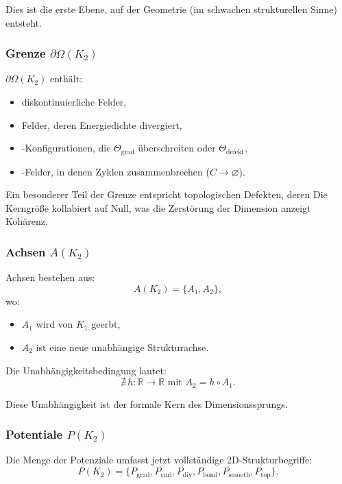 Dies ist die erste Ebene, auf der Geometrie (im schwachen strukturellen Sinne)
entsteht.

\subsubsection{Grenze \texorpdfstring{$\partial\Omega(K_2)$}{\partial\Omega(K_2)}}

$\partial\Omega(K_2)$ enthält:
\begin{itemize}
    \item diskontinuierliche Felder,
    \item Felder, deren Energiedichte divergiert,
    \item-Konfigurationen, die $\Theta_{\mathrm{grad}}$ überschreiten oder
          $\Theta_{\mathrm{defekt}}$,
    \item-Felder, in denen Zyklen zusammenbrechen ($C \to \varnothing$).
\end{itemize}

Ein besonderer Teil der Grenze entspricht topologischen Defekten, deren
Die Kerngröße kollabiert auf Null, was die Zerstörung der Dimension anzeigt
Kohärenz.

\subsubsection{Achsen \texorpdfstring{$A(K_2)$}{A(K_2)}}

Achsen bestehen aus:
\[
A(K_2) = \{A_1, A_2\},
\]
wo:
\begin{itemize}
    \item $A_1$ wird von $K_1$ geerbt,
    \item $A_2$ ist eine neue unabhängige Strukturachse.
\end{itemize}

Die Unabhängigkeitsbedingung lautet:
\[
\nexists\, h: \mathbb{R} \to \mathbb{R} \text{ mit } A_2 = h \circ A_1.
\]

Diese Unabhängigkeit ist der formale Kern des Dimensionssprungs.

\subsubsection{Potentiale \texorpdfstring{$P(K_2)$}{P(K_2)}}

Die Menge der Potenziale umfasst jetzt vollständige 2D-Strukturbegriffe:
\[
P(K_2) =
\{ P_{\mathrm{grad}}, P_{\mathrm{curl}}, P_{\mathrm{div}},
   P_{\mathrm{bond}}, P_{\mathrm{smooth}}, P_{\mathrm{top}} \}.
\]

